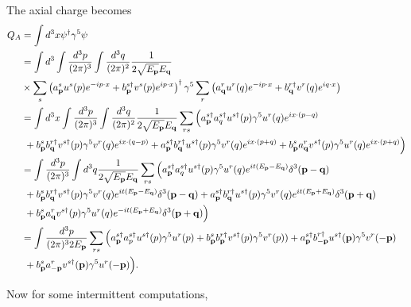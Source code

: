 \documentclass[11pt, a4paper]{amsart}
\begin{document}
The axial charge becomes
\begin{align}
Q_A 	&= \int d^3x \psi^\dagger \gamma^5 \psi \\
 		&= \int d^3 \int \frac{d^3p}{(2\pi)^3} \int \frac{d^3q}{(2\pi)^2} \frac{1}{2\sqrt{E_{\vb{p}}} E_{\vb{q}}} \\
 		 &\times \sum_s \left(a_{\vb{p}}^su^s(p)e^{-ip\cdot x} + b_{\vb{p}}^{s\dagger}v^s(p) e^{ip\cdot x}\right)^\dagger
 		 \gamma^5
 		 			 \sum_r\left(a_{\vb{q}}^r u^r(q) e^{-ip\cdot x} + b_{\vb{q}}^{r\dagger}v^r(q)e^{iq\cdot x} \right) \nonumber \\
 		&= \int d^3x \int \frac{d^3p}{(2\pi)^3} \int \frac{d^3q}{(2\pi)^2} \frac{1}{2\sqrt{E_{\vb{p}}} E_{\vb{q}}} 
 		\sum_{rs} \Big( a_{\vb{p}}^{s\dagger}a_{q}^{s\dagger} u^{s\dagger}(p) \gamma^5 u^r(q) e^{ix\cdot (p-q)}\\
 		&\ + b_{\vb{p}}^s b_{\vb{q}}^{r\dagger}v^{s\dagger}(p) \gamma^5v^r(q)e^{ix\cdot (q-p)}
 		     + a_{\vb{p}}^{s\dagger}b_{\vb{q}}^{r\dagger} u^{s\dagger}(p) \gamma^5 v^r(q) e^{ix\cdot(p+q)}
 		     + b_{\vb{p}}^s a_{\vb{q}}^r v^{s\dagger}(p) \gamma^5 u^r(q) e^{ix\cdot (p+q)}\Big) \nonumber  \\
 		&= \int \frac{d^3p}{(2\pi)^3} \int d^3q \frac{1}{2\sqrt{E_{\vb{p}}} E_{\vb{q}}} 
 		\sum_{rs} \Big( a_{\vb{p}}^{s\dagger}a_q^{s\dagger} u^{s\dagger}(p) \gamma^5 u^r(q) e^{it(E_{\vb{p}} - E_{\vb{q}})} \delta^3(\vb{p} - \vb{q})\\
 		&\ + b_{\vb{p}}^s b_{\vb{q}}^{r\dagger}v^{s\dagger}(p) \gamma^5v^r(q)e^{it(E_{\vb{p}} - E_{\vb{q}})} \delta^3(\vb{p} - \vb{q})
 		     + a_{\vb{p}}^{s\dagger}b_{\vb{q}}^{r\dagger} u^{s\dagger}(p) \gamma^5 v^r(q) e^{it (E_{\vb{p}} + E_{\vb{q}})} \delta^3(\vb{p} + \vb{q}) \nonumber \\
 		 &\  + b_{\vb{p}}^s a_{\vb{q}}^r v^{s\dagger}(p) \gamma^5 u^r(q) e^{-it (E_{\vb{p}} + E_{\vb{q}})} \delta^3(\vb{p} + \vb{q})\Big) \nonumber \\
 		 &= \int \frac{d^3p}{(2\pi)^3 2E_{\vb{p}}} \sum_{rs} \Big( a_{\vb{p}}^{s\dagger}a_p^{s\dagger} u^{s\dagger}(p) \gamma^5 u^r(p) 
 		    + b_{\vb{p}}^s b_{\vb{p}}^{r\dagger}v^{s\dagger}(p) \gamma^5v^r(p))
 		    + a_{\vb{p}}^{s\dagger}b_{\vb{-p}}^{r\dagger} u^{s\dagger}(\vb{p}) \gamma^5 v^r(-\vb{p}) \nonumber \\
 	 &\    + b_{\vb{p}}^s a_{-\vb{p}}^r v^{s\dagger}(\vb{p}) \gamma^5 u^r(-\vb{p})  \Big).
\end{align}

Now for some intermittent computations,
\end{document}
